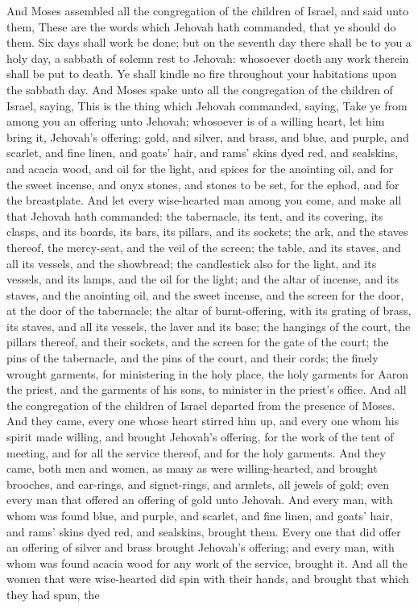 And Moses assembled all the congregation of the children of Israel, and said unto them, These are the words which Jehovah hath commanded, that ye should do them. Six days shall work be done; but on the seventh day there shall be to you a holy day, a sabbath of solemn rest to Jehovah: whosoever doeth any work therein shall be put to death. Ye shall kindle no fire throughout your habitations upon the sabbath day.  And Moses spake unto all the congregation of the children of Israel, saying, This is the thing which Jehovah commanded, saying, Take ye from among you an offering unto Jehovah; whosoever is of a willing heart, let him bring it, Jehovah’s offering: gold, and silver, and brass, and blue, and purple, and scarlet, and fine linen, and goats’ hair, and rams’ skins dyed red, and sealskins, and acacia wood, and oil for the light, and spices for the anointing oil, and for the sweet incense, and onyx stones, and stones to be set, for the ephod, and for the breastplate.  And let every wise-hearted man among you come, and make all that Jehovah hath commanded: the tabernacle, its tent, and its covering, its clasps, and its boards, its bars, its pillars, and its sockets; the ark, and the staves thereof, the mercy-seat, and the veil of the screen; the table, and its staves, and all its vessels, and the showbread; the candlestick also for the light, and its vessels, and its lamps, and the oil for the light; and the altar of incense, and its staves, and the anointing oil, and the sweet incense, and the screen for the door, at the door of the tabernacle; the altar of burnt-offering, with its grating of brass, its staves, and all its vessels, the laver and its base; the hangings of the court, the pillars thereof, and their sockets, and the screen for the gate of the court; the pins of the tabernacle, and the pins of the court, and their cords; the finely wrought garments, for ministering in the holy place, the holy garments for Aaron the priest, and the garments of his sons, to minister in the priest’s office.  And all the congregation of the children of Israel departed from the presence of Moses. And they came, every one whose heart stirred him up, and every one whom his spirit made willing, and brought Jehovah’s offering, for the work of the tent of meeting, and for all the service thereof, and for the holy garments. And they came, both men and women, as many as were willing-hearted, and brought brooches, and ear-rings, and signet-rings, and armlets, all jewels of gold; even every man that offered an offering of gold unto Jehovah. And every man, with whom was found blue, and purple, and scarlet, and fine linen, and goats’ hair, and rams’ skins dyed red, and sealskins, brought them. Every one that did offer an offering of silver and brass brought Jehovah’s offering; and every man, with whom was found acacia wood for any work of the service, brought it. And all the women that were wise-hearted did spin with their hands, and brought that which they had spun, the 